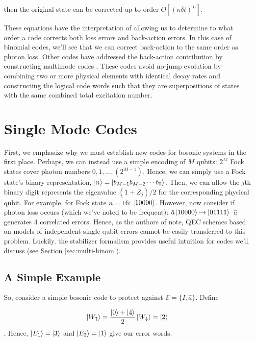 \documentclass[12]{amsart}
\newcommand\0{\mathbf{0}}
\newcommand\<{\langle}
\renewcommand\>{\rangle}
\begin{document}
then the original state can be corrected up to order $O[(\kappa \delta t)^L]$.

These equations have the interpretation of allowing us to determine to what order a code corrects both loss errors and back-action errors. In this case of binomial codes, we'll see that we can correct back-action to the same order as photon loss. Other codes have addressed the back-action contribution by constructing multimode codes \cite{chuang1997bosonic}. These codes avoid no-jump evolution by combining two or more physical elements with identical decay rates and constructing the logical code words such that they are superpositions of states with the same combined total excitation number.

\section{Single Mode Codes}

First, we emphasize why we must establish new codes for bosonic systems in the first place. Perhaps, we can instead use a simple encoding of $M$ qubits: $2^M$ Fock states cover photon numbers $0, 1, . . . , (2^{M - 1})$. Hence, we can simply use a Fock state's binary representation, $\ket{n} = \ket{b_{M-1} b_{M-2} \cdots b_0 }$. Then, we can allow the $j$th binary digit represents the eigenvalue $(1 + Z_j)/2$ for the corresponding physical qubit. For example, for Fock state $n=16$: $\ket{10000}$. However, now consider if photon loss occurs (which we've noted to be frequent): $\hat{a}\ket{10000} \mapsto \ket{01111}$--$\hat{a}$ generates 4 correlated errors. Hence, as the authors of \cite{michael2016new} note, QEC schemes based on models of independent single qubit errors cannot be easily transferred to this problem. Luckily, the stabilizer formalism provides useful intuition for codes we'll discuss (see Section \ref{sec:multi-binom}).

\subsection{A Simple Example}
\label{sec:simple}

So, consider a simple bosonic code to protect against $\mathcal{E} = \{ I, \hat{a} \}$. Define 

$$
\ket{W_\uparrow} = \frac{\ket{0} + \ket{4}}{2}\\
\ket{W_\downarrow} = \ket{2}
$$. Hence, $\ket{E_1} = \ket{3}$ and $\ket{E_2} = \ket{1}$ give our error words. 
\end{document}
